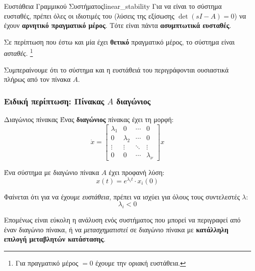\documentclass[11pt,a4paper,notitlepage,fleqn]{article}
\begin{document}
\begin{theorem}{Ευστάθεια Γραμμικού Συστήματος}{linear_stability}
	Για να είναι το σύστημα ευσταθές,
	πρέπει όλες οι ιδιοτιμές του (λύσεις της εξίσωσης \( \det(sI-A)=0 \)) να έχουν
	\textbf{αρνητικό πραγματικό μέρος}. Τότε είναι πάντα \textbf{ασυμπτωτικά ευσταθές}.
	
	Σε περίπτωση που έστω και μία έχει \textbf{θετικό} πραγματικό
	μέρος, το σύστημα είναι \textit{ασταθές}. \footnote{Για πραγματικό μέρος
		\( =0 \) έχουμε την οριακή ευστάθεια.}
	
\end{theorem}

Συμπεραίνουμε ότι το σύστημα και η ευστάθειά του περιγράφονται ουσιαστικά πλήρως
από τον πίνακα \( A \).

\subsubsection{Ειδική περίπτωση: Πίνακας \( A \) διαγώνιος}
\begin{defn}{Διαγώνιος πίνακας}{}
	Ένας \textbf{διαγώνιος} πίνακας έχει τη μορφή:\[
	\dot x = \left[\begin{matrix}
	\lambda_1 & 0 & \cdots & 0 \\
	0 & \lambda_2 & \cdots & 0 \\
	\vdots & \vdots & \ddots & \vdots \\
	0 & 0 & \cdots & \lambda_\nu
	\end{matrix}
	\right] x
	\]
\end{defn}

Ένα σύστημα με διαγώνιο πίνακα \( A \) έχει προφανή λύση:
\[
x(t) = e^{\lambda_i t} \cdot x_i(0)
\]

Φαίνεται ότι για να έχουμε \textit{ευστάθεια}, πρέπει να ισχύει για όλους τους
συντελεστές \( \lambda \):
\[
\lambda_i < 0
\]

Επομένως είναι εύκολη η ανάλυση ενός συστήματος που μπορεί να περιγραφεί από
έναν διαγώνιο πίνακα, ή να \textit{μετασχηματιστεί} σε διαγώνιο πίνακα
με \textbf{κατάλληλη επιλογή μεταβλητών κατάστασης}.
\end{document}
